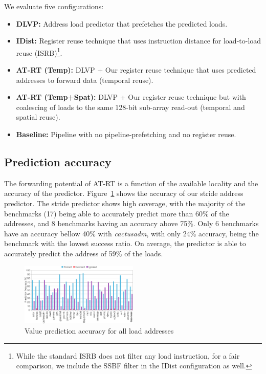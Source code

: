 \documentclass{sig-alternate}
\begin{document}
We evaluate five configurations: 

\begin{itemize}
\item \textbf{DLVP:} Address load predictor that prefetches the predicted loads.
\item \textbf{IDist:} Register reuse technique that uses instruction distance for load-to-load reuse (ISRB)\footnote{While the standard ISRB does not filter any load instruction, for a fair comparison, we include the SSBF filter in the IDist configuration as well.}. 
\item \textbf{AT-RT (Temp):} DLVP + Our register reuse technique that uses predicted addresses to forward data (temporal reuse).
\item \textbf{AT-RT (Temp+Spat):} DLVP + Our register reuse technique but with coalescing of loads to the same 128-bit sub-array read-out (temporal and spatial reuse).
\item \textbf{Baseline:} Pipeline with no pipeline-prefetching and no register reuse.
\end{itemize}


\subsection{Prediction accuracy}
The forwarding potential of AT-RT is a function of the available locality and the accuracy of the predictor. Figure~\ref{fig:VPAccuracy} shows the accuracy of our stride address predictor. The stride predictor shows high coverage, with the majority of the benchmarks (17) being able to accurately predict more than 60\% of the addresses, and 8 benchmarks having an accuracy above 75\%. Only 6 benchmarks have an accuracy bellow 40\% with \textit{cactusadm}, with only 24\% accuracy, being the benchmark with the lowest success ratio. On average, the predictor is able to accurately predict the address of 59\% of the loads.


\begin{figure}[ht]
\centerline{\includegraphics[width=0.50\textwidth]{graphs/ValuePredAccuracy.pdf}}
\caption{Value prediction accuracy for all load addresses}
\label{fig:VPAccuracy}
\end{figure}
\end{document}
